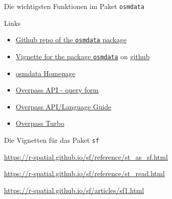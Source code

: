 \documentclass[ignorenonframetext,]{beamer}
\providecommand{\tightlist}{%
  \setlength{\itemsep}{0pt}\setlength{\parskip}{0pt}}
\begin{document}
\begin{frame}{Die wichtigsten Funktionen im Paket \texttt{osmdata}}

\end{frame}

\begin{frame}[fragile]{Links}

\begin{itemize}
\tightlist
\item
  \href{https://github.com/ropensci/osmdata}{Github repo of the
  \texttt{osmdata} package}
\item
  \href{https://cran.r-project.org/web/packages/osmdata/vignettes/osmdata.html}{Vignette
  for the package \texttt{osmdata}} on
  \href{https://github.com/ropensci/osmdata/blob/master/vignettes/osmdata.Rmd}{github}
\item
  \href{https://ropensci.github.io/osmdata/}{osmdata Homepage}
\item
  \href{http://overpass-api.de/query_form.html}{Overpass API - query
  form}
\item
  \href{https://wiki.openstreetmap.org/wiki/DE:Overpass_API/Language_Guide}{Overpass
  API/Language Guide}
\item
  \href{https://wiki.openstreetmap.org/wiki/DE:Overpass_turbo}{Overpass
  Turbo} 
\end{itemize}

\begin{block}{Die Vignetten für das Paket \texttt{sf}}

\url{https://r-spatial.github.io/sf/reference/st_as_sf.html}

\url{https://r-spatial.github.io/sf/reference/st_read.html}

\url{https://r-spatial.github.io/sf/articles/sf1.html}

\end{block}

\end{frame}
\end{document}
